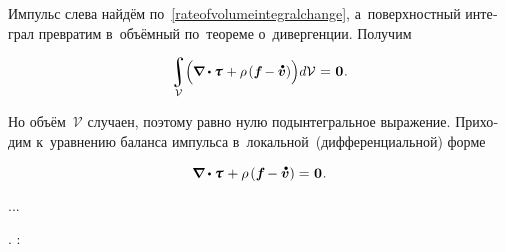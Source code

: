 \begin{otherlanguage}{russian}

\noindent
Импульс слева найдём по~\eqref{rateofvolumeintegralchange}, а~поверхностный интеграл превратим в~объёмный по~теореме о~дивергенции.
Получим

\nopagebreak\vspace{-0.1em}\begin{equation*}
\scalebox{.96}{$\displaystyle\integral\displaylimits_{\mathcal{V}} \hspace{-0.5ex} \left(^{\mathstrut} \hspace{-0.16ex} \boldnabla \dotp \cauchystress \hspace{.15ex}
+ \rho \hspace{-0.1ex} \left( \bm{f} \hspace{-0.2ex} - \mathdotabove{\bm{v}} \right) \right) \hspace{-0.33ex} d\mathcal{V}$} \hspace{.1ex}
= \hspace{.1ex} \bm{0}
\hspace{.1ex} .
\end{equation*}

\vspace{-0.25em}\noindent
Но объём~$\mathcal{V}$ случаен, поэтому равно нулю подынтегральное выражение.
Приходим к~уравнению баланса импульса в~локальной~(дифференциальной) форме

\nopagebreak\vspace{-0.1em}\begin{equation}\label{balanceoftranslationalmomentum.local}
\boldnabla \dotp \cauchystress \hspace{.15ex}
+ \rho \hspace{-0.1ex} \left( \bm{f} \hspace{-0.2ex} - \mathdotabove{\bm{v}} \right)
= \hspace{.1ex} \bm{0}
\hspace{.1ex} .
\end{equation}

...

  .
:


\end{otherlanguage}
